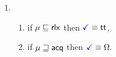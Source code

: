 \begin{minipage}{1.0\linewidth}
\begin{multicols}{2}
\begin{enumerate}[topsep=0pt,label=(\textsc{r}\arabic*),ref=\textsc{r}\arabic*]
      \columnbreak
    \item[] 
      \begin{enumerate}[leftmargin=0pt]
      \item \label{read-term-nonempty-ca-addr}
        if $\mu\sqsubseteq{\mathsf{rlx}}$ then $\aTerm \riff \TRUE$,
      \item \label{read-term-empty-ca-addr}
        if $\mu\sqsupseteq{\mathsf{acq}}$ then
        \begin{math}
          \aTerm \riff
          \emptyForm.
        \end{math}
      \end{enumerate}      
    \end{enumerate}
  \end{multicols}
\end{minipage}
